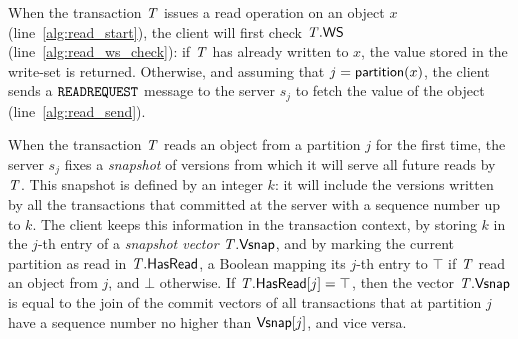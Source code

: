 When the transaction $\mathit{T}$ issues a read operation on an object $x$ (line~\ref{alg:read_start}), the client will first check $\mathit{T}.\mathsf{WS}$ (line~\ref{alg:read_ws_check}): if $\mathit{T}$ has already written to $x$, the value stored in the write-set is returned. Otherwise, and assuming that $j = \mathsf{partition}(x)$, the client sends a ${\tt READREQUEST}$ message to the server $s_j$ to fetch the value of the object (line~\ref{alg:read_send}).

When the transaction $\mathit{T}$ reads an object from a partition $j$ for the first time, the server $s_j$ fixes a \emph{snapshot} of versions from which it will serve all future reads by $\mathit{T}$. This snapshot is defined by an integer $k$: it will include the versions written by all the transactions that committed at the server with a sequence number up to $k$. The client keeps this information in the transaction context, by storing $k$ in the $j$-th entry of a \emph{snapshot vector} $\mathit{T}.\mathsf{Vsnap}$, and by marking the current partition as read in $\mathit{T}.\mathsf{HasRead}$, a Boolean mapping its $j$-th entry to $\top$ if $\mathit{T}$ read an object from $j$, and $\bot$ otherwise. If $\mathit{T}.\mathsf{HasRead}[j]=\top$, then the vector $\mathit{T}.\mathsf{Vsnap}$ is equal to the join of the commit vectors of all transactions that at partition $j$ have a sequence number no higher than $\mathsf{Vsnap}[j]$, and vice versa.

